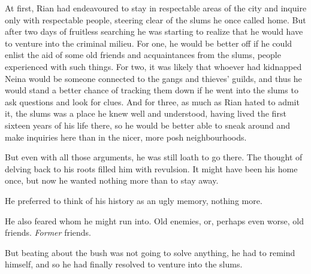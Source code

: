At first, Rian had endeavoured to stay in respectable areas of the city and inquire only with respectable people, steering clear of the slums he once called home. 
But after two days of fruitless searching he was starting to realize that he would have to venture into the criminal milieu. 
For one, he would be better off if he could enlist the aid of some old friends and acquaintances from the slums, people experienced with such things. 
For two, it was likely that whoever had kidnapped Neina would be someone connected to the gangs and thieves' guilds, and thus he would stand a better chance of tracking them down if he went into the slums to ask questions and look for clues. 
And for three, as much as Rian hated to admit it, the slums was a place he knew well and understood, having lived the first sixteen years of his life there, so he would be better able to sneak around and make inquiries here than in the nicer, more posh neighbourhoods. 

But even with all those arguments, he was still loath to go there. 
The thought of delving back to his roots filled him with revulsion. 
It might have been his home once, but now he wanted nothing more than to stay away. 

He preferred to think of his history as an ugly memory, nothing more. 

He also feared whom he might run into. 
Old enemies, or, perhaps even worse, old friends. 
\emph{Former} friends. 

But beating about the bush was not going to solve anything, he had to remind himself, and so he had finally resolved to venture into the slums. 



